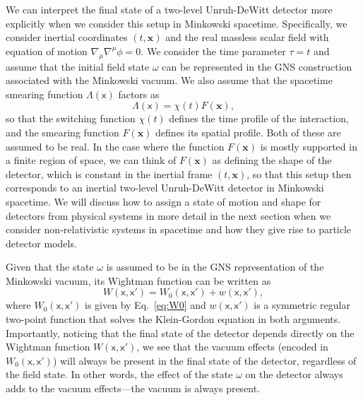 \documentclass[letterpaper,12pt,titlepage,oneside,final]{book}
\newcommand{\mf}{\mathsf}%
\begin{document}
We can interpret the final state of a two-level Unruh-DeWitt detector more explicitly when we consider this setup in Minkowski spacetime. Specifically, we consider inertial coordinates $(t,\bm x)$ and the real massless scalar field with equation of motion $\nabla_\mu \nabla^\mu\phi = 0$. We consider the time parameter $\tau = t$ and assume that the initial field state $\omega$ can be represented in the GNS construction associated with the Minkowski vacuum. We also assume that the spacetime smearing function $\Lambda(\mf x)$ factors as
\begin{equation}
    \Lambda(\mf x) = \chi(t) F(\bm x),
\end{equation}
so that the switching function $\chi(t)$ defines the time profile of the interaction, and the smearing function $F(\bm x)$ defines its spatial profile. Both of these are assumed to be real. In the case where the function $F(\bm x)$ is mostly supported in a finite region of space, we can think of $F(\bm x)$ as defining the shape of the detector, which is constant in the inertial frame $(t,\bm x)$, so that this setup then corresponds to an inertial two-level Unruh-DeWitt detector in Minkowski spacetime. We will discuss how to assign a state of motion and shape for detectors from physical systems in more detail in the next section when we consider non-relativistic systems in spacetime and how they give rise to particle detector models.

Given that the state $\omega$ is assumed to be in the GNS representation of the Minkowski vacuum, its Wightman function can be written as
\begin{equation}
    W(\mf x, \mf x') = W_0(\mf x, \mf x') + w(\mf x, \mf x'),
\end{equation}
where $W_0(\mf x, \mf x')$ is given by Eq.~\eqref{eq:W0} and $w(\mf x, \mf x')$ is a symmetric regular two-point function that solves the Klein-Gordon equation in both arguments. Importantly, noticing that the final state of the detector depends directly on the Wightman function $W(\mf x, \mf x')$, we see that the vacuum effects (encoded in $W_0(\mf x, \mf x')$) will always be present in the final state of the detector, regardless of the field state. In other words, the effect of the state $\omega$ on the detector always adds to the vacuum effects---the vacuum is always present.
\end{document}
